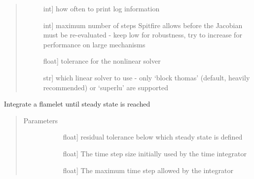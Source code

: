 \documentclass[letterpaper,10pt,english]{sphinxmanual}
\begin{document}
\begin{fulllineitems}
\begin{fulllineitems}
\begin{quote}
\begin{description}
\begin{description}
\item[{}] \leavevmode{[}int{]}
how often to print log information

\item[{}] \leavevmode{[}int{]}
maximum number of steps Spitfire allows before the Jacobian must be re-evaluated - keep low for robustness, try to increase for performance on large mechanisms

\item[{}] \leavevmode{[}float{]}
tolerance for the nonlinear solver

\item[{}] \leavevmode{[}str{]}
which linear solver to use - only ‘block thomas’ (default, heavily recommended) or ‘superlu’ are supported

\end{description}

\end{description}\end{quote}

\end{fulllineitems}


\begin{fulllineitems}
\label{\detokenize{spitfire.chemistry.flamelet:spitfire.chemistry.flamelet.Flamelet.integrate_to_steady}}
Integrate a flamelet until steady state is reached
\begin{quote}\begin{description}
\item[{Parameters}] \leavevmode\begin{description}
\item[{}] \leavevmode{[}float{]}
residual tolerance below which steady state is defined

\item[{}] \leavevmode{[}float{]}
The time step size initially used by the time integrator

\item[{}] \leavevmode{[}float{]}
The maximum time step allowed by the integrator


\end{description}
\end{description}
\end{quote}
\end{fulllineitems}
\end{fulllineitems}
\end{document}
